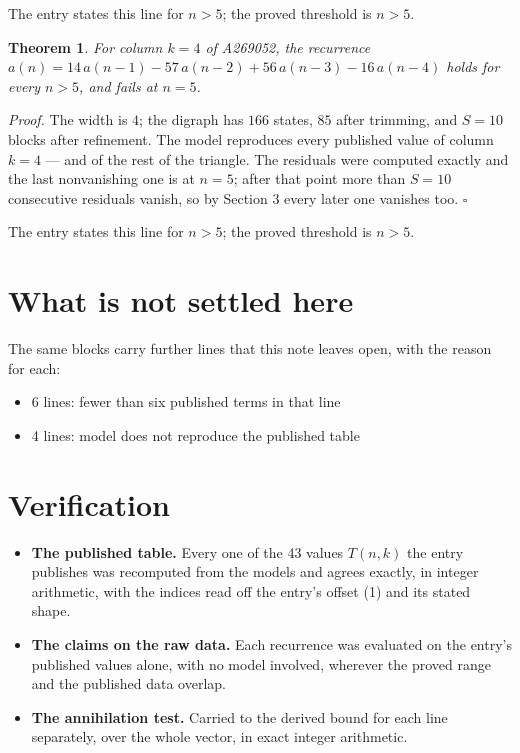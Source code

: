 \documentclass[11pt]{article}
\newtheorem{theorem}{Theorem}
\theoremstyle{definition}
\begin{document}
The entry states this line for $n > 5$; the proved threshold is $n > 5$.

\begin{theorem} For column $k = 4$ of A269052, the recurrence $a(n) = 14\,a(n-1) - 57\,a(n-2) + 56\,a(n-3) - 16\,a(n-4)$ holds for every $n > 5$, and fails at $n = 5$.\end{theorem}

{\itshape Proof.} The width is $4$; the digraph has $166$ states, $85$ after trimming, and $S = 10$ blocks after refinement. The model reproduces every published value of column $k = 4$ --- and of the rest of the triangle. The residuals were computed exactly and the last nonvanishing one is at $n = 5$; after that point more than $S = 10$ consecutive residuals vanish, so by Section 3 every later one vanishes too. $\square$

The entry states this line for $n > 5$; the proved threshold is $n > 5$.

\section{What is not settled here}

The same blocks carry further lines that this note leaves open, with the reason for each:

\begin{itemize}

\item 6 lines: fewer than six published terms in that line

\item 4 lines: model does not reproduce the published table

\end{itemize}

\section{Verification}

\begin{itemize}

\item {\bfseries The published table.} Every one of the 43 values $T(n,k)$ the entry publishes was recomputed from the models and agrees exactly, in integer arithmetic, with the indices read off the entry's offset (1) and its stated shape.

\item {\bfseries The claims on the raw data.} Each recurrence was evaluated on the entry's published values alone, with no model involved, wherever the proved range and the published data overlap.

\item {\bfseries The annihilation test.} Carried to the derived bound for each line separately, over the whole vector, in exact integer arithmetic.

\end{itemize}
\end{document}
